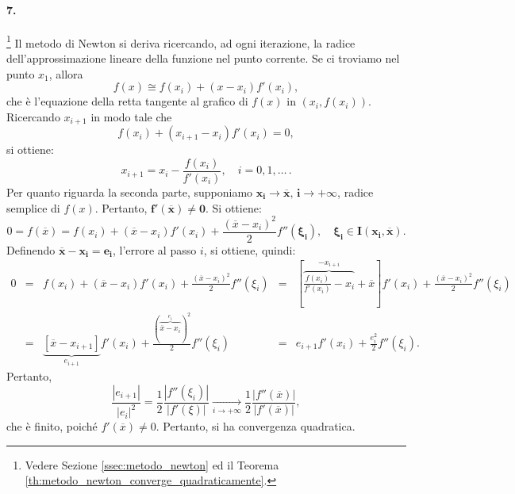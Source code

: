 \paragraph{7.}\footnote{Vedere Sezione \ref{ssec:metodo_newton} ed il Teorema \ref{th:metodo_newton_converge_quadraticamente}.} Il metodo di Newton si deriva ricercando, ad ogni iterazione, la radice dell'approssimazione lineare della funzione nel punto corrente. Se ci troviamo nel punto $x_1$, allora
\begin{equation*}
	f(x)\cong f(x_i)+(x-x_i)f'(x_i),
\end{equation*}
che è l'equazione della retta tangente al grafico di $f(x)$ in $(x_i, f(x_i))$.\\
Ricercando $x_{i+1}$ in modo tale che
\begin{equation*}
	f(x_i)+(x_{i+1}-x_i)f'(x_i)=0,
\end{equation*}
si ottiene:
\begin{equation*}
	x_{i+1}=x_i-\frac{f(x_i)}{f'(x_i)},\quad i=0,1,\hdots\, .
\end{equation*}
Per quanto riguarda la seconda parte, supponiamo $\boldsymbol{x_i\rightarrow\overline{x},\, i\rightarrow +\infty}$, radice semplice di $f(x)$. Pertanto, $\boldsymbol{f'(\overline{x})\neq 0}$. Si ottiene:
\begin{equation*}
	0=f(\overline{x})=f(x_i)+(\overline{x}-x_i)f'(x_i)+\frac{(\overline{x}-x_i)^2}{2}f''(\boldsymbol{\xi_i}),\quad \boldsymbol{\xi_i\in I(x_i,\overline{x})}.
\end{equation*}
Definendo $\boldsymbol{\overline{x}-x_i = e_i}$, l'errore al passo $i$, si ottiene, quindi:
\begin{equation*}
	\begin{matrix}
		0 &=& f(x_i)+(\overline{x}-x_i)f'(x_i)+\frac{(\overline{x}-x_i)^2}{2}f''(\xi_i) &=& \left[\overbrace{\frac{f(x_i)}{f'(x_i)}-x_i}^{-x_{i+i}} + \overline{x}\right]f'(x_i) + \frac{(\overline{x}-x_i)^2}{2} f''(\xi_i)\\
		&=& \underbrace{\left[\overline{x}-x_{i+1}\right]}_{e_{i+1}} f'(x_i) + \frac{(\overbrace{\overline{x}-x_i}^{e_i})^2}{2} f''(\xi_i) &=& e_{i+1} f'(x_i) + \frac{e_i^2}{2} f''(\xi_i).
	\end{matrix}
\end{equation*}
Pertanto,
\begin{equation*}
	\frac{|e_{i+1}|}{|e_i|^2}=\frac{1}{2}\frac{|f''(\xi_i)|}{|f'(\xi)|}\underset{i\rightarrow+\infty}{\longrightarrow}\frac{1}{2}\frac{|f''(\overline{x})|}{|f'(\overline{x})|},
\end{equation*}
che è finito, poiché $f'(\overline{x})\neq 0$. Pertanto, si ha convergenza quadratica.

